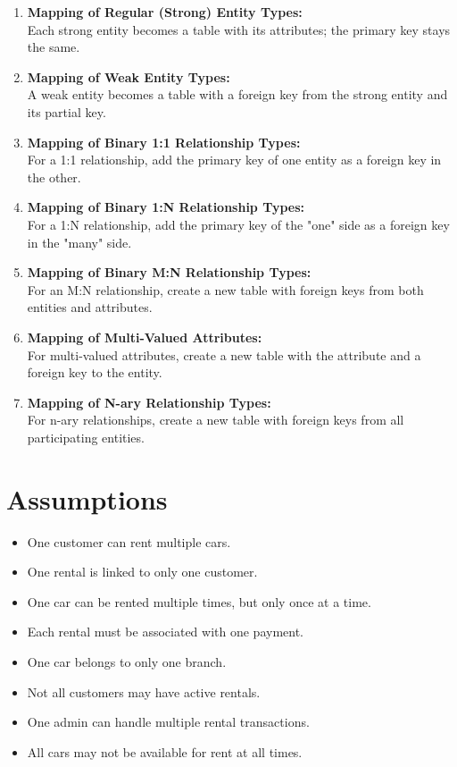 \documentclass[12pt,a4paper]{report}
\begin{document}
\begin{enumerate}
    \item \textbf{Mapping of Regular (Strong) Entity Types:} \\
    Each strong entity becomes a table with its attributes; the primary key stays the same.
    
    \item \textbf{Mapping of Weak Entity Types:} \\
    A weak entity becomes a table with a foreign key from the strong entity and its partial key.

    \item \textbf{Mapping of Binary 1:1 Relationship Types:} \\
    For a 1:1 relationship, add the primary key of one entity as a foreign key in the other.

    \item \textbf{Mapping of Binary 1:N Relationship Types:} \\
    For a 1:N relationship, add the primary key of the "one" side as a foreign key in the "many" side.

    \item \textbf{Mapping of Binary M:N Relationship Types:} \\
    For an M:N relationship, create a new table with foreign keys from both entities and attributes.

    \item \textbf{Mapping of Multi-Valued Attributes:} \\
    For multi-valued attributes, create a new table with the attribute and a foreign key to the entity.

    \item \textbf{Mapping of N-ary Relationship Types:} \\
    For n-ary relationships, create a new table with foreign keys from all participating entities.
\end{enumerate}


\section{Assumptions}
\begin{itemize}
	\item One customer can rent multiple cars.
        \item One rental is linked to only one customer.
        \item One car can be rented multiple times, but only once at a time.
        \item Each rental must be associated with one payment.
        \item One car belongs to only one branch.
        \item Not all customers may have active rentals.
        \item One admin can handle multiple rental transactions.
        \item All cars may not be available for rent at all times.

	
\end{itemize}
\end{document}
